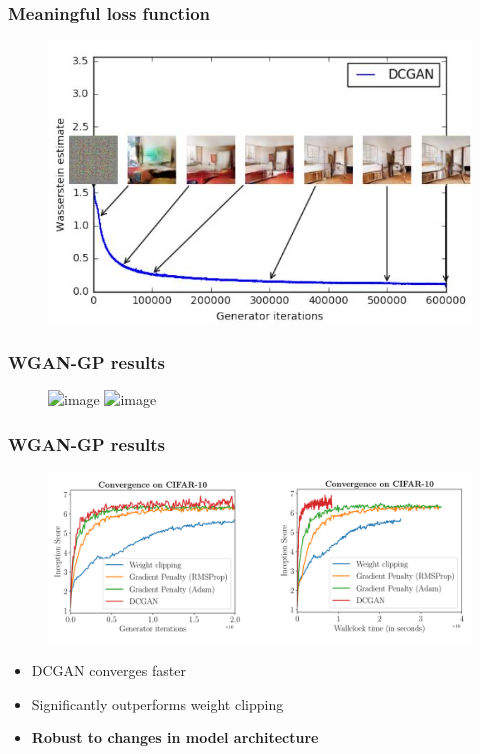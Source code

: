 \documentclass{Bredelebeamer}
\begin{document}
\begin{frame}
	\frametitle{Meaningful loss function}
	\begin{figure}[h!]
		\centering
		\includegraphics[width=\textwidth]{wgan_loss.jpg}
	\end{figure}
\end{frame}

\begin{frame} \frametitle{WGAN-GP results}
	\begin{figure}[h!]
	\centering
	\includegraphics<1>[width=\textwidth]{wgan_gp_results_1.png}
	\includegraphics<2>[width=\textwidth]{wgan_gp_results_2.png}
	\end{figure}
\end{frame}
\begin{frame} \frametitle{WGAN-GP results}
	\begin{figure}[h!]
	\centering
	\includegraphics[width=\textwidth]{wgan_gp_graph_results.png}
	\end{figure}
	\begin{itemize}
		\item DCGAN converges faster
		\item Significantly outperforms weight clipping
		\item \textbf{Robust to changes in model architecture}
	\end{itemize}
\end{frame}
\end{document}
